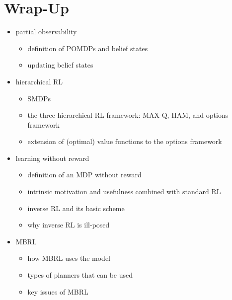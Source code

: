 	\section{Wrap-Up}
		\begin{itemize}
			\item partial observability
				\begin{itemize}
					\item definition of \acp{POMDP} and belief states
					\item updating belief states
				\end{itemize}
			\item hierarchical \ac{RL}
				\begin{itemize}
					\item \acp{SMDP}
					\item the three hierarchical \ac{RL} framework: MAX-Q, \ac{HAM}, and options framework
					\item extension of (optimal) value functions to the options framework
				\end{itemize}
			\item learning without reward
				\begin{itemize}
					\item definition of an \ac{MDP} without reward
					\item intrinsic motivation and usefulness combined with standard \ac{RL}
					\item inverse \ac{RL} and its basic scheme
					\item why inverse \ac{RL} is ill-posed
				\end{itemize}
			\item \ac{MBRL}
				\begin{itemize}
					\item how \ac{MBRL} uses the model
					\item types of planners that can be used
					\item key issues of \ac{MBRL}
				\end{itemize}
		\end{itemize}
